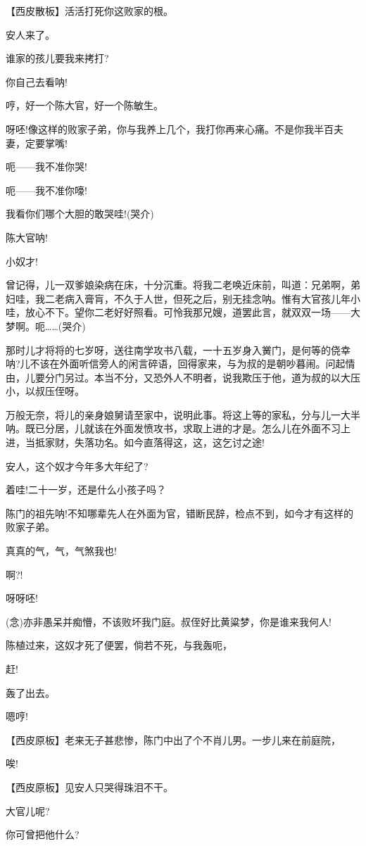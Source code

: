 【西皮散板】活活打死你这败家的根。

安人来了。

谁家的孩儿要我来拷打?

你自己去看呐!

哼，好一个陈大官，好一个陈敏生。

呀呸!像这样的败家子弟，你与我养上几个，我打你再来心痛。不是你我半百夫妻，定要掌嘴!

呃------我不准你哭!

呃------我不准你嚎!

我看你们哪个大胆的敢哭哇!(哭介)

陈大官呐!

小奴才!

曾记得，儿一双爹娘染病在床，十分沉重。将我二老唤近床前，叫道：兄弟啊，弟妇哇，我二老病入膏肓，不久于人世，但死之后，别无挂念呐。惟有大官孩儿年小哇，放心不下。望你二老好好照看。可怜我那兄嫂，道罢此言，就双双一场------大梦啊。呃\ldots{}\ldots{}(哭介)

那时儿才将将的七岁呀，送往南学攻书八载，一十五岁身入黉门，是何等的侥幸呐?儿不该在外面听信旁人的闲言碎语，回得家来，与为叔的是朝吵暮闹。问起情由，儿要分门另过。本当不分，又恐外人不明者，说我欺压于他，道为叔的以大压小，以叔压侄呀。

万般无奈，将儿的亲身娘舅请至家中，说明此事。将这上等的家私，分与儿一大半呐。既已分居，儿就该在外面发愤攻书，求取上进的才是。怎么儿在外面不习上进，当抵家财，失落功名。如今直落得这，这，这乞讨之途!

安人，这个奴才今年多大年纪了?

着哇!二十一岁，还是什么小孩子吗？

陈门的祖先呐!不知哪辈先人在外面为官，错断民辞，检点不到，如今才有这样的败家子弟。

真真的气，气，气煞我也!

啊?!

呀呀呸!

(念)亦非愚呆并痴懵，不该败坏我门庭。叔侄好比黄粱梦，你是谁来我何人!

陈植过来，这奴才死了便罢，倘若不死，与我轰呃，

赶!

轰了出去。

嗯哼!

【西皮原板】老来无子甚悲惨，陈门中出了个不肖儿男。一步儿来在前庭院，

唉!

【西皮原板】见安人只哭得珠泪不干。

大官儿呢?

你可曾把他什么?

